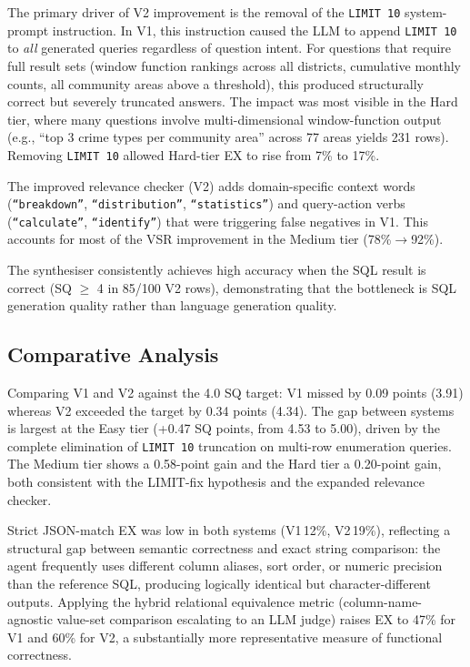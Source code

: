 \documentclass{article}
\begin{document}
The primary driver of V2 improvement is the removal of the \texttt{LIMIT 10} system-prompt instruction. In V1, this instruction caused the LLM to append \texttt{LIMIT 10} to \emph{all} generated queries regardless of question intent. For questions that require full result sets (window function rankings across all districts, cumulative monthly counts, all community areas above a threshold), this produced structurally correct but severely truncated answers. The impact was most visible in the Hard tier, where many questions involve multi-dimensional window-function output (e.g., ``top 3 crime types per community area'' across 77 areas yields 231 rows). Removing \texttt{LIMIT 10} allowed Hard-tier EX to rise from 7\% to 17\%.

The improved relevance checker (V2) adds domain-specific context words (\texttt{``breakdown''}, \texttt{``distribution''}, \texttt{``statistics''}) and query-action verbs (\texttt{``calculate''}, \texttt{``identify''}) that were triggering false negatives in V1. This accounts for most of the VSR improvement in the Medium tier (78\%$\rightarrow$92\%).

The synthesiser consistently achieves high accuracy when the SQL result is correct (SQ $\geq$ 4 in 85/100 V2 rows), demonstrating that the bottleneck is SQL generation quality rather than language generation quality.

\subsection{Comparative Analysis}

Comparing V1 and V2 against the 4.0 SQ target: V1 missed by 0.09 points (3.91) whereas V2 exceeded the target by 0.34 points (4.34). The gap between systems is largest at the Easy tier (+0.47 SQ points, from 4.53 to 5.00), driven by the complete elimination of \texttt{LIMIT 10} truncation on multi-row enumeration queries. The Medium tier shows a 0.58-point gain and the Hard tier a 0.20-point gain, both consistent with the LIMIT-fix hypothesis and the expanded relevance checker.

Strict JSON-match EX was low in both systems (V1\,12\%, V2\,19\%), reflecting a structural gap between semantic correctness and exact string comparison: the agent frequently uses different column aliases, sort order, or numeric precision than the reference SQL, producing logically identical but character-different outputs. Applying the hybrid relational equivalence metric (column-name-agnostic value-set comparison escalating to an LLM judge) raises EX to 47\% for V1 and 60\% for V2, a substantially more representative measure of functional correctness.
\end{document}
